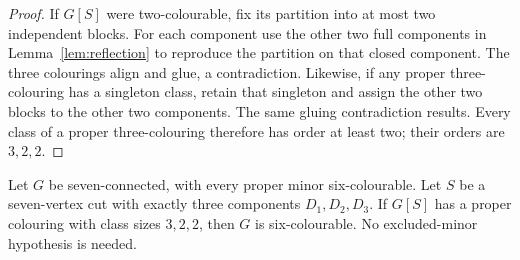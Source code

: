 \begin{proof}
If $G[S]$ were two-colourable, fix its partition into at most two
independent blocks.  For each component use the other two full components
in Lemma~\ref{lem:reflection} to reproduce the partition on that closed
component.  The three colourings align and glue, a contradiction.
Likewise, if any proper three-colouring has a singleton class, retain that
singleton and assign the other two blocks to the other two components.
The same gluing contradiction results.  Every class of a proper
three-colouring therefore has order at least two; their orders are
$3,2,2$.
\end{proof}

\begin{theorem}\label{thm:three-component-colouring}
Let $G$ be seven-connected, with every proper minor six-colourable.  Let
$S$ be a seven-vertex cut with exactly three components $D_1,D_2,D_3$.
If $G[S]$ has a proper colouring with class sizes $3,2,2$, then $G$ is
six-colourable.  No excluded-minor hypothesis is needed.
\end{theorem}

